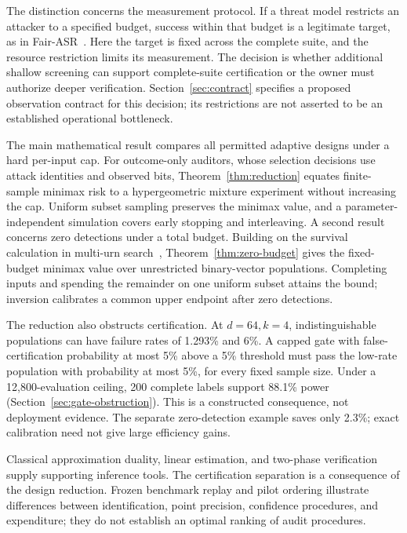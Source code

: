 \documentclass[conference]{IEEEtran}
\begin{document}
The distinction concerns the measurement protocol. If a threat model restricts an attacker to a specified budget, success within that budget is a legitimate target, as in Fair-ASR~\cite{fairasr}. Here the target is fixed across the complete suite, and the resource restriction limits its measurement. The decision is whether additional shallow screening can support complete-suite certification or the owner must authorize deeper verification. Section~\ref{sec:contract} specifies a proposed observation contract for this decision; its restrictions are not asserted to be an established operational bottleneck.

The main mathematical result compares all permitted adaptive designs under a hard per-input cap. For outcome-only auditors, whose selection decisions use attack identities and observed bits, Theorem~\ref{thm:reduction} equates finite-sample minimax risk to a hypergeometric mixture experiment without increasing the cap. Uniform subset sampling preserves the minimax value, and a parameter-independent simulation covers early stopping and interleaving. A second result concerns zero detections under a total budget. Building on the survival calculation in multi-urn search~\cite{marks}, Theorem~\ref{thm:zero-budget} gives the fixed-budget minimax value over unrestricted binary-vector populations. Completing inputs and spending the remainder on one uniform subset attains the bound; inversion calibrates a common upper endpoint after zero detections.

The reduction also obstructs certification. At $d=64,k=4$, indistinguishable populations can have failure rates of 1.293\% and 6\%. A capped gate with false-certification probability at most 5\% above a 5\% threshold must pass the low-rate population with probability at most 5\%, for every fixed sample size. Under a 12,800-evaluation ceiling, 200 complete labels support 88.1\% power (Section~\ref{sec:gate-obstruction}). This is a constructed consequence, not deployment evidence. The separate zero-detection example saves only 2.3\%; exact calibration need not give large efficiency gains.

Classical approximation duality, linear estimation, and two-phase verification~\cite{polyanskiy,wu,begg,mcnamee} supply supporting inference tools. The certification separation is a consequence of the design reduction. Frozen benchmark replay and pilot ordering illustrate differences between identification, point precision, confidence procedures, and expenditure; they do not establish an optimal ranking of audit procedures.
\end{document}
